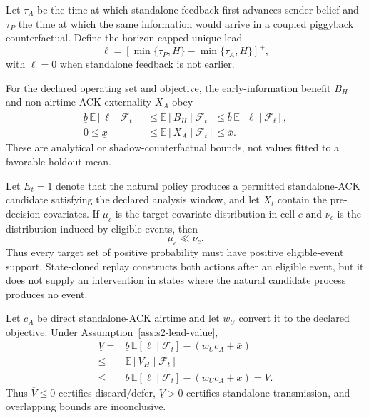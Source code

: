 Let $\tau_A$ be the time at which standalone feedback first advances sender
belief and $\tau_P$ the time at which the same information would arrive in a
coupled piggyback counterfactual.  Define the horizon-capped unique lead
\begin{equation}
\ell=[\min\{\tau_P,H\}-\min\{\tau_A,H\}]^+,
\label{eq:s2-ack-unique-lead}
\end{equation}
with $\ell=0$ when standalone feedback is not earlier.

\begin{assumption}
For the declared operating set and objective, the early-information benefit
$B_H$ and non-airtime ACK externality $X_A$ obey
\begin{align}
\underline b\,\mathbb E[\ell\mid\mathcal F_t]
&\le\mathbb E[B_H\mid\mathcal F_t]
\le\overline b\,\mathbb E[\ell\mid\mathcal F_t],\label{eq:s2-lead-benefit}\\
0\le\underline x&\le\mathbb E[X_A\mid\mathcal F_t]\le\overline x.
\label{eq:s2-ack-externality}
\end{align}
These are analytical or shadow-counterfactual bounds, not values fitted to a
favorable holdout mean.
\label{ass:s2-lead-value}
\end{assumption}

\begin{assumption}
Let $E_t=1$ denote that the natural policy produces a permitted standalone-ACK
candidate satisfying the declared analysis window, and let $X_t$ contain the
pre-decision covariates.  If $\mu_c$ is the target covariate distribution in
cell $c$ and $\nu_c$ is the distribution induced by eligible events, then
\begin{equation}
\mu_c\ll\nu_c.
\label{eq:s2-event-support}
\end{equation}
Thus every target set of positive probability must have positive
eligible-event support.  State-cloned replay constructs both actions after an
eligible event, but it does not supply an intervention in states where the
natural candidate process produces no event.
\label{ass:s2-event-support}
\end{assumption}

\begin{proposition}
Let $c_A$ be direct standalone-ACK airtime and let $w_U$ convert it to the
declared objective.  Under Assumption~\ref{ass:s2-lead-value},
\begin{equation}
\begin{split}
\underline V={}&\underline b\,\mathbb E[\ell\mid\mathcal F_t]
 -(w_Uc_A+\overline x)\\
\le{}&\mathbb E[V_H\mid\mathcal F_t]\\
\le{}&\overline b\,\mathbb E[\ell\mid\mathcal F_t]
 -(w_Uc_A+\underline x)=\overline V.
\end{split}
\label{eq:s2-ack-value-bounds}
\end{equation}
Thus $\overline V\le0$ certifies discard/defer,
$\underline V>0$ certifies standalone transmission, and overlapping bounds
are inconclusive.
\label{prop:s2-ack-value}
\end{proposition}

